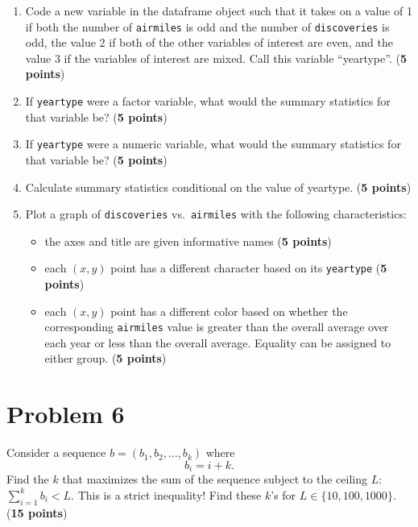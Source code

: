 \documentclass[10pt,letterpaper]{article}
\begin{document}
\begin{enumerate}
\item Code a new variable in the dataframe object such that it takes
  on a value of 1 if both the number of \texttt{airmiles} is odd and
  the number of \texttt{discoveries} is odd, the value 2 if both of
  the other variables of interest are even, and the value 3 if the
  variables of interest are mixed. Call this variable
  ``yeartype''. (\textbf{5 points})

\item If \texttt{yeartype} were a factor variable, what would the
  summary statistics for that variable be? (\textbf{5 points})

\item If \texttt{yeartype} were a numeric variable, what would the
  summary statistics for that variable be? (\textbf{5 points})

\item Calculate summary statistics conditional on the value of
  yeartype. (\textbf{5 points})

\item Plot a graph of \texttt{discoveries} vs.\ \texttt{airmiles} with
  the following characteristics:
  \begin{itemize}
  \item the axes and title are given informative names (\textbf{5 points})
  \item each $(x,y)$ point has a different character based on its \texttt{yeartype} (\textbf{5 points})
  \item each $(x,y)$ point has a different color based on whether the
    corresponding \texttt{airmiles} value is greater than the overall
    average over each year or less than the overall average. Equality
    can be assigned to either group. (\textbf{5 points})
  \end{itemize}
\end{enumerate}

% 

\section*{Problem 6}
Consider a sequence $b = (b_1, b_2, \ldots, b_k)$ where
\[
b_i = i + k.
\]
Find the $k$ that maximizes the sum of the sequence subject to the
ceiling $L$: $\sum_{i = 1}^{k} b_i < L$. This is a strict inequality!
Find these $k$'s for $L \in \lbrace 10, 100, 1000 \rbrace$. (\textbf{15 points})

%


\end{document}
